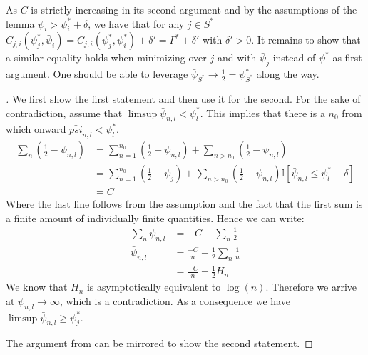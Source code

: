 \begin{remark}
  As $C$ is strictly increasing in its second argument and by the assumptions of
  the lemma $\bar{\psi}_i > \psi_i^* + \delta$, we have that for any $j \in S^*$
  $C_{j, i}(\psi_j^*, \bar{\psi}_i) = C_{j, i}(\psi_j^*, \psi_i^*) + \delta' =
  \Gamma^* + \delta'$ with $\delta' > 0$. It remains to show that a similar
  equality holds when minimizing over $j$ and with $\bar{\psi}_j$ instead of
  $\psi^*$ as first argument. One should be able to leverage $\bar{\psi}_{S^*}
  \rightarrow \frac{1}{2} = \psi_{S^*}^*$ along the way.
\end{remark}

\begin{proof}[]
    We first show the first statement and then use it for the second. For the
    sake of contradiction, assume that $\limsup \bar{\psi}_{n, l} <
    \psi_l^*$. This implies that there is a $n_0$ from which onward
    $\bar{psi}_{n, l} < \psi_l^*$.
    \begin{align}
      \sum_n (\frac{1}{2} - \psi_{n, l}) &= \sum_{n=1}^{n_0} (\frac{1}{2} -
            \psi_{n, l}) + \sum_{n > n_0} (\frac{1}{2} - \psi_{n, l}) \\
        &= \sum_{n=1}^{n_0} (\frac{1}{2} - \psi_j) + \sum_{n > n_0}
            (\frac{1}{2} - \psi_{n, l})\mathbb{I}[\bar{\psi}_{n, l} \leq
            \psi_l^* - \delta] \\
        &= C
    \end{align}
    Where the last line follows from the assumption and the fact that the first
    sum is a finite amount of individually finite quantities. Hence we can
    write:
    \begin{align}
      \sum_n \psi_{n, l} &= -C + \sum_n \frac{1}{2} \\
      \bar{\psi}_{n, l} &= \frac{-C}{n} + \frac{1}{2}\sum_n\frac{1}{n} \\
        &= \frac{-C}{n} + \frac{1}{2} H_n
    \end{align}
    We know that $H_n$ is asymptotically equivalent to $\log(n)$. Therefore we
    arrive at $\bar{\psi}_{n, l} \rightarrow \infty$, which is a contradiction.
    As a consequence we have $\limsup \bar{\psi}_{n, l} \geq \psi_j^*$.

    The argument from  can be
    mirrored to show the second statement.
  \end{proof}

